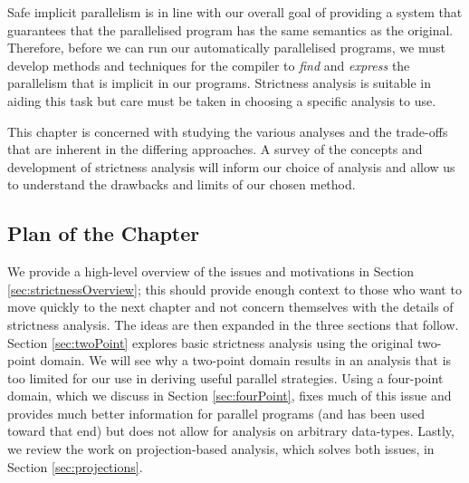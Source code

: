 Safe implicit parallelism is in line with our overall goal of providing a system
that guarantees that the parallelised program has the same semantics as the
original. Therefore, before we can run our automatically parallelised programs,
we must develop methods and techniques for the compiler to \emph{find} and
\emph{express} the parallelism that is implicit in our programs. Strictness
analysis is suitable in aiding this task but care must be taken in choosing a
specific analysis to use.

This chapter is concerned with studying the various analyses and the
trade-offs that are inherent in the differing approaches. A survey of the
concepts and development of strictness analysis will inform our choice of
analysis and allow us to understand the drawbacks and limits of our chosen
method.

\subsection*{Plan of the Chapter}

We provide a high-level overview of the issues and motivations in Section
\ref{sec:strictnessOverview}; this should provide enough context to those who
want to move quickly to the next chapter and not concern themselves with the
details of strictness analysis. The ideas are then expanded in the three
sections that follow. Section \ref{sec:twoPoint} explores basic strictness
analysis using the original two-point domain. We will see why a two-point
domain results in an analysis that is too limited for our use in deriving
useful parallel strategies. Using a four-point domain, which we discuss in
Section \ref{sec:fourPoint}, fixes much of this issue and provides much better
information for parallel programs (and has been used toward that end) but does
not allow for analysis on arbitrary data-types. Lastly, we review the work on
projection-based analysis, which solves both issues, in Section
\ref{sec:projections}.
